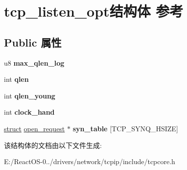 \hypertarget{structtcp__listen__opt}{}\section{tcp\+\_\+listen\+\_\+opt结构体 参考}
\label{structtcp__listen__opt}
\subsection*{Public 属性}
\begin{DoxyCompactItemize}
\item 
\mbox{\label{structtcp__listen__opt_a4ca64db985d4791f7867244c889308e7}} 
u8 {\bfseries max\+\_\+qlen\+\_\+log}
\item 
\mbox{\label{structtcp__listen__opt_a87dae7d58b0e82f4921c7c16d88a868e}} 
int {\bfseries qlen}
\item 
\mbox{\label{structtcp__listen__opt_a9c2609a1d2398431ab4c622b302d4570}} 
int {\bfseries qlen\+\_\+young}
\item 
\mbox{\label{structtcp__listen__opt_a0186036a711126d914d981016424ffb3}} 
int {\bfseries clock\+\_\+hand}
\item 
\mbox{\label{structtcp__listen__opt_a9f69813fc74cb9d029752f4506957421}} 
\hyperlink{interfacestruct}{struct} \hyperlink{structopen__request}{open\+\_\+request} $\ast$ {\bfseries syn\+\_\+table} \mbox{[}T\+C\+P\+\_\+\+S\+Y\+N\+Q\+\_\+\+H\+S\+I\+ZE\mbox{]}
\end{DoxyCompactItemize}


该结构体的文档由以下文件生成\+:\begin{DoxyCompactItemize}
\item 
E\+:/\+React\+O\+S-\/0../drivers/network/tcpip/include/tcpcore.\+h\end{DoxyCompactItemize}

